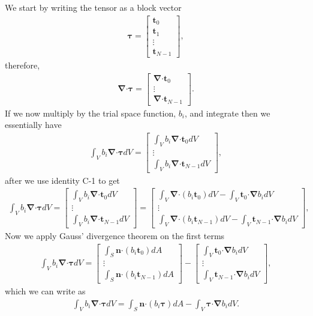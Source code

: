 \documentclass[10pt,letterpaper,notitlepage]{article}
\numberwithin{equation}{section}
\newcommand{\bnabla}{\boldsymbol{\nabla}}
\newcommand{\dotp}{\boldsymbol{\cdot}}
\newcommand{\beqn}{\begin{equation}\begin{aligned}}
\newcommand{\eeqn}{\end{aligned}\end{equation}}
\begin{document}
\begin{appendices}
We start by writing the tensor as a block vector
\beqn 
\boldsymbol{\tau} = 
\begin{bmatrix}
\mathbf{t}_0 \\ \mathbf{t}_1 \\ \vdots \\ \mathbf{t}_{N-1}
\end{bmatrix},
\eeqn 
therefore,
\beqn 
\bnabla \dotp \boldsymbol{\tau} =
\begin{bmatrix}
	\bnabla \dotp \mathbf{t}_0 \\ \vdots \\ \bnabla \dotp \mathbf{t}_{N-1}
\end{bmatrix}.
\eeqn 
If we now multiply by the trial space function, $b_i$, and integrate then we essentially have
\beqn 
\int_V b_i \bnabla \dotp \boldsymbol{\tau} dV =
\begin{bmatrix}
	\displaystyle \int_V b_i \bnabla \dotp \mathbf{t}_0 dV \\ 
	\vdots \\ 
	\displaystyle \int_V b_i \bnabla \dotp \mathbf{t}_{N-1}dV
\end{bmatrix},
\eeqn 
after we use identity C-1 to get
\beqn 
\int_V b_i \bnabla \dotp \boldsymbol{\tau} dV =
\begin{bmatrix}
	\displaystyle \int_V b_i \bnabla \dotp \mathbf{t}_0 dV \\ 
	\vdots \\ 
	\displaystyle \int_V b_i \bnabla \dotp \mathbf{t}_{N-1}dV
\end{bmatrix}
=
\begin{bmatrix}
	\displaystyle \int_V \bnabla \dotp (b_i \mathbf{t}_0) dV - \int_V \mathbf{t}_0 \dotp \bnabla b_i dV \\ 
	\vdots \\ 
	\displaystyle \int_V \bnabla \dotp (b_i \mathbf{t}_{N-1}) dV - \int_V \mathbf{t}_{N-1} \dotp \bnabla b_i dV
\end{bmatrix},
\eeqn 
Now we apply Gauss' divergence theorem on the first terms
\beqn 
\int_V b_i \bnabla \dotp \boldsymbol{\tau} dV =
\begin{bmatrix}
	\displaystyle \int_S \mathbf{n} \dotp (b_i \mathbf{t}_0) dA\\
	\vdots \\
	\displaystyle \int_S \mathbf{n} \dotp (b_i \mathbf{t}_{N-1}) dA
\end{bmatrix}
-
\begin{bmatrix}
	\displaystyle \int_V \mathbf{t}_0 \dotp \bnabla b_i dV\\
	\vdots \\
	\displaystyle \int_V \mathbf{t}_{N-1} \dotp \bnabla b_i dV
\end{bmatrix},
\eeqn 
which we can write as
\beqn 
\int_V b_i \bnabla \dotp \boldsymbol{\tau} dV =
\int_S \mathbf{n} \dotp (b_i \boldsymbol{\tau}) dA
-
\int_V \boldsymbol{\tau} \dotp \bnabla b_i dV.
\eeqn 


\end{appendices}
\end{document}
